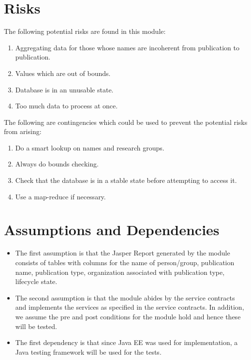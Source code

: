 \section{Risks}
\label{risks}
	The following potential risks are found in this module:
\begin{enumerate}
	\item Aggregating data for those whose names are incoherent from publication to publication.
	\item Values  which are out of bounds.
	\item Database is in an unusable state.
	\item Too much data to process at once.
\end{enumerate}

	The following are contingencies which could be used to prevent the potential risks from arising:
\begin{enumerate}

	\item Do a smart lookup on names and research groups.
	\item Always do bounds checking.
	\item Check that the database is in a stable state before attempting to access it.
	\item Use a map-reduce if necessary.


\end{enumerate}

\section{Assumptions and Dependencies}
\label{sec:assumptions}
\begin{itemize}
	\item The first assumption is that the Jasper Report generated by the module consists of tables with columns for the name of person/group, publication name, publication type, organization associated with publication type, lifecycle state.
	\item The second assumption is that the module abides by the service contracts and implements the services as specified in the service contracts. In addition, we assume the pre and post conditions for the module hold and hence these will be tested.
	\item The first dependency is that since Java EE was used for implementation, a Java testing framework will be used for the tests.
\end{itemize}
\hypertarget{labelr}{}
